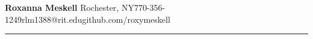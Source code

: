 \documentclass[10pt]{article} %
\newcommand{\makeheading}[2][]%
{\hspace*{-\marginparsep minus \marginparwidth}%
	\begin{minipage}[t]{\textwidth+\marginparwidth+\marginparsep}%
		{\LARGE \bfseries #2 \hfill #1}\\[-0.15\baselineskip]%
		\rule{\columnwidth}{1pt}%
	\end{minipage}}
\renewcommand{\section}[1]{\pagebreak[3]%
	\par %
	\phantomsection\addcontentsline{toc}{section}{#1}%
	\noindent\llap{\scshape\smash{\parbox[t]{\marginparwidth}{\hyphenpenalty=10000\raggedright #1}}}%
	\vspace{-\baselineskip}\par}
\begin{document}
	\hspace*{-\marginparsep minus \marginparwidth}%
	\begin{minipage}[t]{\textwidth+\marginparwidth+\marginparsep}%
		{\LARGE \bfseries Roxanna Meskell}%
		\hspace*{1em}Rochester, NY\hspace*{.5em}\textbar\hspace*{.5em}770-356-1249\hspace*{.5em}\textbar\hspace*{.5em}rlm1388@rit.edu\hspace*{.5em}\textbar\hspace*{.5em}github.com/roxymeskell
		\\[-0.5\baselineskip]
		\rule{\columnwidth}{1pt}%
	\end{minipage}
	\newlength{\rcollength}\setlength{\rcollength}{2in}%
	\newlength{\spacewidth}\setlength{\spacewidth}{20pt}%
	\newcommand\spacechar{$|$}%
%	
%		
%		
\end{document}
